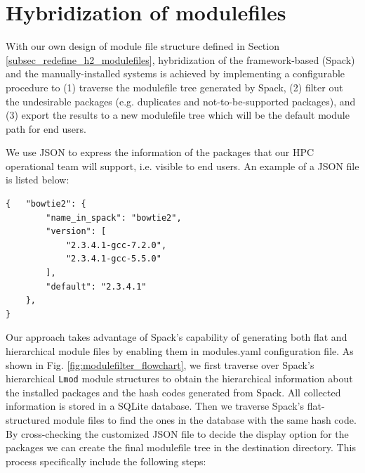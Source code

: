 \documentclass[conference]{IEEEtran}
\begin{document}
\section{Hybridization of modulefiles}\label{subsec_modulefile_processing}

With our own design of module file structure defined in Section \ref{subsec_redefine_h2_modulefiles}, hybridization of the framework-based (Spack) and the manually-installed systems is achieved by implementing a configurable procedure to (1) traverse the modulefile tree generated by Spack, (2) filter out the undesirable packages (e.g. duplicates and not-to-be-supported packages), and (3) export the results to a new modulefile tree which will be the default module path for end users.

We use JSON to express the information of the packages that our HPC operational team will support, i.e. visible to end users. An example of a JSON file is listed below:

{\small
\begin{verbatim}
{   "bowtie2": {
        "name_in_spack": "bowtie2",
        "version": [
            "2.3.4.1-gcc-7.2.0",
            "2.3.4.1-gcc-5.5.0"
        ],
        "default": "2.3.4.1"
    },
}
\end{verbatim}
}


Our approach takes advantage of Spack's capability of generating both flat and hierarchical module files by enabling them in modules.yaml configuration file. As shown in Fig. \ref{fig:modulefilter_flowchart}, we first traverse over Spack's hierarchical \texttt{Lmod}\cite{mclay:11} module structures to obtain the hierarchical information about the installed packages and the hash codes generated from Spack. All collected information is stored in a SQLite database. Then we traverse Spack's flat-structured module files to find the ones in the database with the same hash code. By cross-checking the customized JSON file to decide the display option for the packages we can create the final modulefile tree in the destination directory. This process specifically include the following steps:
\end{document}
